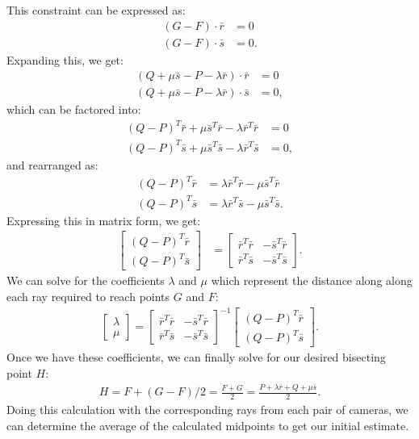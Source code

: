 \documentclass[11pt, letterpaper]{extarticle} %
\begin{document}
This constraint can be expressed as:
\begin{align*}
    (G - F) \cdot \bar{r} &= 0 \\
    (G - F) \cdot \bar{s} &= 0.
\end{align*}
Expanding this, we get:
\begin{align*}
    (Q + \mu \bar{s} - P - \lambda \bar{r}) \cdot \bar{r} &= 0 \\
    (Q + \mu \bar{s} - P - \lambda \bar{r}) \cdot \bar{s} &= 0,
\end{align*}
which can be factored into:
\begin{align*}
    (Q - P)^T \bar{r} + \mu \bar{s}^T \bar{r} - \lambda \bar{r}^T \bar{r} &= 0 \\
    (Q - P)^T \bar{s} + \mu \bar{s}^T \bar{s} - \lambda \bar{r}^T \bar{s} &= 0,
\end{align*}
and rearranged as:
\begin{align*}
    (Q - P)^T \bar{r} &= \lambda \bar{r}^T \bar{r} - \mu \bar{s}^T \bar{r} \\
    (Q - P)^T \bar{s} &= \lambda \bar{r}^T \bar{s} - \mu \bar{s}^T \bar{s}.
\end{align*}
Expressing this in matrix form, we get:
\begin{align*}
    \begin{bmatrix}
    (Q - P)^T \bar{r}\\
    (Q - P)^T \bar{s}
    \end{bmatrix}
    &=
    \begin{bmatrix}
    \bar{r}^T \bar{r} & -\bar{s}^T \bar{r} \\
    \bar{r}^T \bar{s} & -\bar{s}^T \bar{s}
    \end{bmatrix}.
\end{align*}
We can solve for the coefficients $\lambda$ and $\mu$ which represent the distance along along each ray required to reach points $G$ and $F$:
\begin{align}
    \begin{bmatrix}
    \lambda \\ 
    \mu
    \end{bmatrix}
    =
    \begin{bmatrix}
    \bar{r}^T \bar{r} & -\bar{s}^T \bar{r} \\
    \bar{r}^T \bar{s} & -\bar{s}^T \bar{s}
    \end{bmatrix}^{-1}
    \begin{bmatrix}
    (Q - P)^T \bar{r} \\
    (Q - P)^T \bar{s}
    \end{bmatrix}.
\end{align}
Once we have these coefficients, we can finally solve for our desired bisecting point $H$:
\begin{align} \label{eq:midpoint_two_view_H}
    H = F + (G - F)/2 = \frac{F + G}{2} = \frac{P + \lambda \bar{r} + Q + \mu \bar{s}}{2}.
\end{align}
Doing this calculation with the corresponding rays from each pair of cameras, we can determine the average of the calculated midpoints to get our initial estimate.
\end{document}

